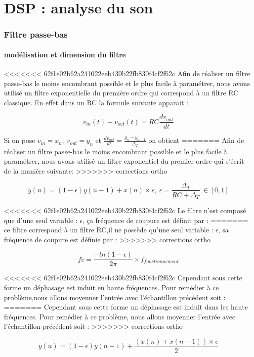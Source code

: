 \documentclass[hidelinks]{article}
\begin{document}
    \part{DSP : analyse du son}
    \section{Filtre passe-bas}
    \subsection{modélisation et dimension du filtre}
<<<<<<< 62f1e02b62a241022eeb430b22fb830f4cf2f62c
    Afin de réaliser un filtre passe-bas le moins encombrant possible et le plus facile à paramétrer, nous avons utilisé un filtre exponentielle du première ordre qui correspond à un filtre RC classique. En effet dans un RC la formule suivante apparait  : 
    \begin{center}
    	\begin{equation}
    	v_{in}(t)-v_{out}(t)=RC\frac{dv_{out}}{dt}
    	\end{equation}
    \end{center}
	Si on pose $v_{in}=x_n,\ v_{out}=y_n$ et $\frac{dv_{out}}{dt}=\frac{y_n-y_{n-1}}{\Delta_T}$ on obtient
=======
    Afin de réaliser un filtre passe-bas le moins encombrant possible et le plus facile à paramétrer, nous avons utilisé un filtre exponentiel du premier ordre qui s'écrit de la manière suivante: 
>>>>>>> corrections ortho
	\begin{center}
		\begin{equation}
			y(n)=(1-\epsilon)y(n-1)+x(n)\times\epsilon ,\; \epsilon=\frac{\Delta_T}{RC+\Delta_T} \ \in [0,1]
		\end{equation}
	\end{center}    
<<<<<<< 62f1e02b62a241022eeb430b22fb830f4cf2f62c
    Le filtre n'est composé que d'une seul variable : $\epsilon$, ça fréquence de coupure est définit par :
=======
    ce filtre correspond à un filtre RC,il ne possède qu'une seul variable : $\epsilon$, sa fréquence de coupure est définie par :
>>>>>>> corrections ortho
    \begin{center}
    	\begin{equation}
    	fc=\frac{-ln(1-\epsilon)}{2\pi}\times f_{fonctionnement}
    	\label{fc}
    	\end{equation}
    \end{center}    
<<<<<<< 62f1e02b62a241022eeb430b22fb830f4cf2f62c
    Cependant sous cette forme un déphasage est induit en haute fréquences. Pour remédier à ce problème,nous allons moyenner l'entrée avec l'échantillon précédent soit :
=======
    Cependant sous cette forme un déphasage est induit dans les haute fréquences. Pour remédier à ce problème, nous allons moyenner l'entrée avec l'échantillon précédent soit :
>>>>>>> corrections ortho
	\begin{center}
		\begin{equation}
			y(n)=(1-\epsilon)y(n-1)+\frac{(x(n)+x(n-1))\times\epsilon}{2}
			\label{formule_f}
		\end{equation}
	\end{center}  
    
\end{document}
